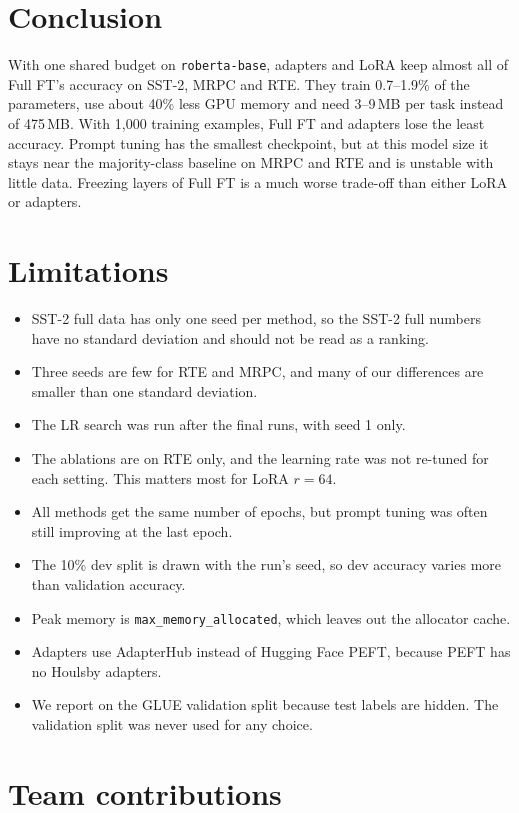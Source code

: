 \documentclass{nle}
\begin{document}
\section{Conclusion}

With one shared budget on \texttt{roberta-base}, adapters and LoRA keep almost all of Full FT's accuracy on SST-2, MRPC and RTE. They train 0.7--1.9\% of the parameters, use about 40\% less GPU memory and need 3--9\,MB per task instead of 475\,MB. With 1,000 training examples, Full FT and adapters lose the least accuracy. Prompt tuning has the smallest checkpoint, but at this model size it stays near the majority-class baseline on MRPC and RTE and is unstable with little data. Freezing layers of Full FT is a much worse trade-off than either LoRA or adapters.

\section{Limitations}

\begin{itemize}
  \item SST-2 full data has only one seed per method, so the SST-2 full numbers have no standard deviation and should not be read as a ranking.
  \item Three seeds are few for RTE and MRPC, and many of our differences are smaller than one standard deviation.
  \item The LR search was run after the final runs, with seed 1 only.
  \item The ablations are on RTE only, and the learning rate was not re-tuned for each setting. This matters most for LoRA $r{=}64$.
  \item All methods get the same number of epochs, but prompt tuning was often still improving at the last epoch.
  \item The 10\% dev split is drawn with the run's seed, so dev accuracy varies more than validation accuracy.
  \item Peak memory is \texttt{max\_memory\_allocated}, which leaves out the allocator cache.
  \item Adapters use AdapterHub instead of Hugging Face PEFT, because PEFT has no Houlsby adapters.
  \item We report on the GLUE validation split because test labels are hidden. The validation split was never used for any choice.
\end{itemize}

\section*{Team contributions}
\end{document}

